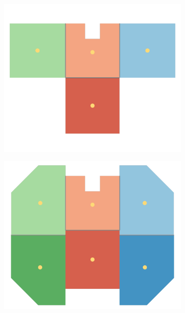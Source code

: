 \begin{figure}[h]
\captionsetup[subfigure]{justification=centering}
\vspace{-2ex}
	\centering
    \setlength{\subfigureWidth}{0.50\textwidth}
    \setlength{\graphicsHeight}{53mm}
    \hypersetup{hidelinks=true}%
    \begin{subfigure}[t]{\subfigureWidth}
        \centering
        \includegraphics[height=\graphicsHeight]{sections/design/solar-array/images/solar_array_layout_iani_chaos.png}
		\label{fig:sub:solar-array-layouts-for-iani-chaos}
    \end{subfigure}\hfill
    \begin{subfigure}[t]{\subfigureWidth}
        \centering
        \includegraphics[height=\graphicsHeight]{sections/design/solar-array/images/solar_array_layout_ismenius_cavus.png}

\end{subfigure}
\end{figure}
